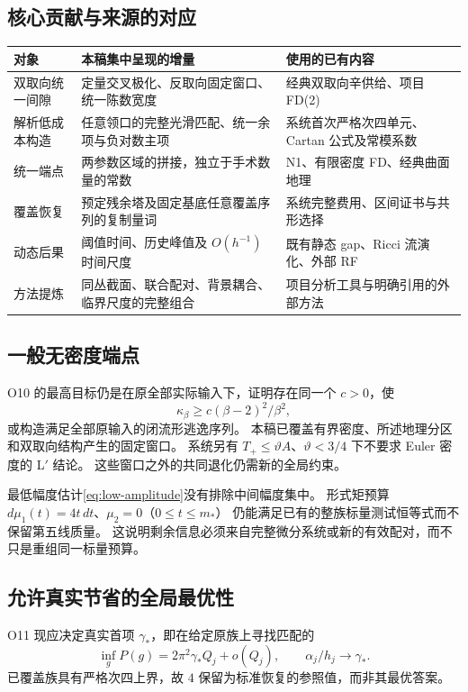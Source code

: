 \documentclass[UTF8,11pt,a4paper,fontset=none]{ctexart}
\numberwithin{equation}{section}
\theoremstyle{definition}
\theoremstyle{remark}\newtheorem{remark}[theorem]{说明}
\begin{document}
\subsection{核心贡献与来源的对应}
\begin{center}
\begin{tabular}{p{}p{}p{}}
\toprule
对象 & 本稿集中呈现的增量 & 使用的已有内容\\
\midrule
双取向统一间隙 & 定量交叉极化、反取向固定窗口、统一陈数宽度 & 经典双取向辛供给、项目 FD(2)\\
解析低成本构造 & 任意领口的完整光滑匹配、统一余项与负对数主项 & 系统首次严格次四单元、Cartan 公式及常模系数\\
统一端点 & 两参数区域的拼接，独立于手术数量的常数 & N1、有限密度 FD、经典曲面地理\\
覆盖恢复 & 预定残余塔及固定基底任意覆盖序列的复制量词 & 系统完整费用、区间证书与共形选择\\
动态后果 & 阈值时间、历史峰值及 $O(h^{-1})$ 时间尺度 & 既有静态 gap、Ricci 流演化、外部 RF\\
方法提炼 & 同丛截面、联合配对、背景耦合、临界尺度的完整组合 & 项目分析工具与明确引用的外部方法\\
\bottomrule
\end{tabular}
\end{center}

\subsection{一般无密度端点}
O10 的最高目标仍是在原全部实际输入下，证明存在同一个 $c>0$，使
\[
\kappa_\beta\ge c(\beta-2)^2/\beta^2,
\]
或构造满足全部原输入的闭流形逃逸序列。
本稿已覆盖有界密度、所述地理分区和双取向结构产生的固定窗口。
系统另有 $T_+\le\vartheta A$、$\vartheta<3/4$ 下不要求 Euler 密度的 L$'$ 结论\cite{System}。
这些窗口之外的共同退化仍需新的全局约束。

最低幅度估计\eqref{eq:low-amplitude}没有排除中间幅度集中。
形式矩预算 $d\mu_1(t)=4t\,dt$、$\mu_2=0$（$0\le t\le m_*$）
仍能满足已有的整族标量测试恒等式而不保留第五线质量\cite{Rate}。
这说明剩余信息必须来自完整微分系统或新的有效配对，而不只是重组同一标量预算。

\subsection{允许真实节省的全局最优性}
O11 现应决定真实首项 $\gamma_*$，即在给定原族上寻找匹配的
\[
\inf_gP(g)=2\pi^2\gamma_*Q_j+o(Q_j),
\qquad\alpha_j/h_j\longrightarrow\gamma_*.
\]
已覆盖族具有严格次四上界，故 $4$ 保留为标准恢复的参照值，而非其最优答案。
\end{document}
